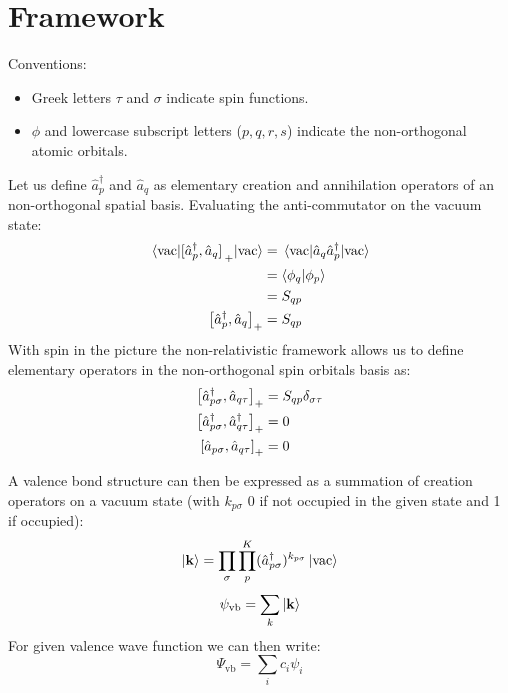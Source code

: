 \section{Framework}
Conventions:
\begin{itemize}
\item Greek letters $\tau$ and $\sigma$ indicate spin functions.
\item $\phi$ and lowercase subscript letters ($p,q,r,s$) indicate the non-orthogonal atomic orbitals.  
\end{itemize}    

Let us define $\hat{a}^\dagger_p$ and $\hat{a}_q$ as elementary creation and annihilation operators of an non-orthogonal spatial basis. 
Evaluating the anti-commutator on the vacuum state:
    \begin{align}
        \ev{\comm*{\hat{a}^\dagger_p}{\hat{a}_q}_+}{\text{vac}} &= \ev{\hat{a}_q \hat{a}^\dagger_p}{\text{vac}} \\
        &= \braket{\phi_q}{\phi_p} \\
        &= {S}_{q p} \\
         \qquad \comm{\hat{a}^\dagger_p}{\hat{a}_q}_+ & = S_{q p} \label{eq:sq_overlap}
\end{align}
With spin in the picture the non-relativistic framework allows us to define elementary operators in the non-orthogonal spin orbitals basis as:
    \begin{align}
        \comm{\hat{a}_{p\sigma}^\dagger}{\hat{a}_{q \tau}}_+ &= S_{q p} \delta_{\sigma \tau} \\
        \comm{\hat{a}_{p\sigma}^\dagger}{\hat{a}^\dagger_{q \tau}}_+ &= 0 \\
        \comm{\hat{a}_{p\sigma}}{\hat{a}_{q \tau}}_+ &= 0 
    \end{align} 

A valence bond structure can then be expressed as a summation of creation operators on a vacuum state (with $k_{p\sigma}$ 0 if not occupied in the given state and 1 if occupied):
    \begin{equation} \label{eq:ON_creators_vacuum}
        \ket{\vb{k}} = \prod_\sigma \prod_p^K (\hat{a}^\dagger_{p\sigma})^{k_{p\sigma}} \ket{\text{vac}} 
    \end{equation}
    \begin{equation} \label{eq:ON_creators_vacuum}
        \psi_{\text{vb}} = \sum_k \ket{\vb{k}} 
    \end{equation}
For given valence wave function  we can then write:
    \begin{equation} \label{eq:ON_creators_vacuum}
        \Psi_{\text{vb}} = \sum_i c_i \psi_{i}
    \end{equation}


